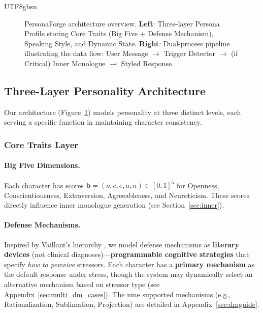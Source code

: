 \documentclass[11pt]{article}
\begin{document}
\begin{CJK*}{UTF8}{gbsn}
\begin{figure}[t]
{
}
\caption{PersonaForge architecture overview. \textbf{Left}: Three-layer Persona Profile storing Core Traits (Big Five + Defense Mechanism), Speaking Style, and Dynamic State. \textbf{Right}: Dual-process pipeline illustrating the data flow: User Message $\rightarrow$ Trigger Detector $\rightarrow$ (if Critical) Inner Monologue $\rightarrow$ Styled Response.}
\label{fig:architecture}
\end{figure}

\subsection{Three-Layer Personality Architecture}

Our architecture (Figure~\ref{fig:architecture}) models personality at three distinct levels, each serving a specific function in maintaining character consistency.

\subsubsection{Core Traits Layer}

\paragraph{Big Five Dimensions.} Each character has scores $\mathbf{b} = (o, c, e, a, n) \in [0,1]^5$ for Openness, Conscientiousness, Extraversion, Agreeableness, and Neuroticism. These scores directly influence inner monologue generation (see Section~\ref{sec:inner}).

\paragraph{Defense Mechanisms.} Inspired by Vaillant's hierarchy \citep{vaillant1994ego}, we model defense mechanisms as \textbf{literary devices} (not clinical diagnoses)---\textbf{programmable cognitive strategies} that specify \textit{how to perceive} stressors. Each character has a \textbf{primary mechanism} as the default response under stress, though the system may dynamically select an alternative mechanism based on stressor type (see Appendix~\ref{sec:multi_dm_cases}). The nine supported mechanisms (e.g., Rationalization, Sublimation, Projection) are detailed in Appendix~\ref{sec:dmguide}.


\end{CJK*}
\end{document}
